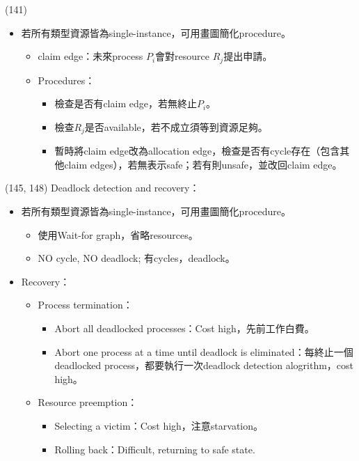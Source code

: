 \begin{theorem}{(141)}
\begin{itemize}
\begin{proof}
        \end{proof}
        \item 若所有類型資源皆為single-instance，可用畫圖簡化procedure。\begin{itemize}
            \item claim edge：未來process $P_i$會對resource $R_j$提出申請。
            \item Procedures：\begin{itemize}
                \item 檢查是否有claim edge，若無終止$P_i$。
                \item 檢查$R_j$是否available，若不成立須等到資源足夠。
                \item 暫時將claim edge改為allocation edge，檢查是否有cycle存在（包含其他claim edges），若無表示safe；若有則unsafe，並改回claim edge。
            \end{itemize}
        \end{itemize}
    \end{itemize}
\end{theorem}

\begin{theorem}{(145, 148)} Deadlock detection and recovery：\begin{itemize}
        \item 若所有類型資源皆為single-instance，可用畫圖簡化procedure。\begin{itemize}
            \item 使用Wait-for graph，省略resources。
            \item NO cycle, NO deadlock; 有cycles，deadlock。
        \end{itemize}
        \item Recovery：\begin{itemize}
            \item Process termination：\begin{itemize}
                \item Abort all deadlocked processes：Cost high，先前工作白費。
                \item Abort one process at a time until deadlock is eliminated：每終止一個deadlocked process，都要執行一次deadlock detection alogrithm，cost high。
            \end{itemize}
            \item Resource preemption：\begin{itemize}
                \item Selecting a victim：Cost high，注意starvation。
                \item Rolling back：Difficult, returning to safe state.
            \end{itemize}
        \end{itemize}
    \end{itemize}
\end{theorem}

